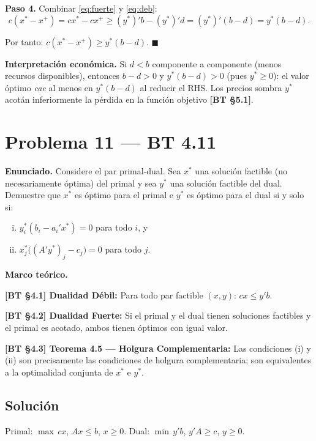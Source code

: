 \documentclass{article}
\newenvironment{marco}{\begin{mdframed}[linecolor=black!40,backgroundcolor=gray!5]\small\textbf{Marco teórico.}\par\smallskip}{\end{mdframed}\medskip}
\begin{document}
\textbf{Paso 4.} Combinar \eqref{eq:fuerte} y \eqref{eq:deb}:
\[
  c(x^* - x^+) = cx^* - cx^+ \geq (y^*)'b - (y^*)'d = (y^*)'(b - d) = y^*(b-d).
\]

Por tanto: $\displaystyle\boxed{c(x^* - x^+) \geq y^*(b-d).}$ $\blacksquare$

\medskip
\textbf{Interpretación económica.} Si $d < b$ componente a componente (menos recursos disponibles), entonces $b - d > 0$ y $y^*(b-d) > 0$ (pues $y^* \geq 0$): el valor óptimo \emph{cae} al menos en $y^*(b-d)$ al reducir el RHS. Los precios sombra $y^*$ acotán inferiormente la pérdida en la función objetivo \textbf{[BT §5.1]}.

\section*{Problema 11 --- BT 4.11}

\textbf{Enunciado.} Considere el par primal-dual. Sea $x^*$ una solución factible (no necesariamente óptima) del primal y sea $y^*$ una solución factible del dual. Demuestre que $x^*$ es óptimo para el primal e $y^*$ es óptimo para el dual si y solo si:
\begin{enumerate}[(i)]
  \item $y_i^*(b_i - a_i'x^*) = 0$ para todo $i$, y
  \item $x_j^*\bigl((A'y^*)_j - c_j\bigr) = 0$ para todo $j$.
\end{enumerate}

\begin{marco}
\textbf{[BT §4.1] Dualidad Débil:} Para todo par factible $(x, y)$: $cx \leq y'b$.

\textbf{[BT §4.2] Dualidad Fuerte:} Si el primal y el dual tienen soluciones factibles y el primal es acotado, ambos tienen óptimos con igual valor.

\textbf{[BT §4.3] Teorema 4.5 — Holgura Complementaria:} Las condiciones (i) y (ii) son precisamente las condiciones de holgura complementaria; son equivalentes a la optimalidad conjunta de $x^*$ e $y^*$.
\end{marco}

\subsection*{Solución}

Primal: $\max\, cx$, $Ax \leq b$, $x \geq 0$. Dual: $\min\, y'b$, $y'A \geq c$, $y \geq 0$.
\end{document}
